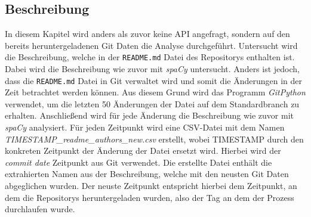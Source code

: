 \subsection{Beschreibung}
\label{subsec:datenbeschaffung_beschreibung}
In diesem Kapitel wird anders als zuvor keine API angefragt, sondern auf den bereits heruntergeladenen Git Daten die Analyse durchgeführt.
Untersucht wird die Beschreibung, welche in der \texttt{README.md} Datei des Repositorys enthalten ist.
Dabei wird die Beschreibung wie zuvor mit \emph{spaCy} untersucht.
Anders ist jedoch, dass die \texttt{README.md} Datei in Git verwaltet wird und somit die Änderungen in der Zeit betrachtet werden können.
Aus diesem Grund wird das Programm \emph{GitPython} verwendet, um die letzten 50 Änderungen der Datei auf dem Standardbranch zu erhalten.
Anschließend wird für jede Änderung die Beschreibung wie zuvor mit \emph{spaCy} analysiert.
Für jeden Zeitpunkt wird eine CSV-Datei mit dem Namen \emph{TIMESTAMP\_readme\_authors\_new.csv} erstellt, wobei TIMESTAMP durch den konkreten Zeitpunkt der Änderung der Datei ersetzt wird.
Hierbei wird der \emph{commit date} Zeitpunkt aus Git verwendet.
Die erstellte Datei enthält die extrahierten Namen aus der Beschreibung, welche mit den neusten Git Daten abgeglichen wurden.
Der neuste Zeitpunkt entspricht hierbei dem Zeitpunkt, an dem die Repositorys heruntergeladen wurden, also der Tag an dem der Prozess durchlaufen wurde.


